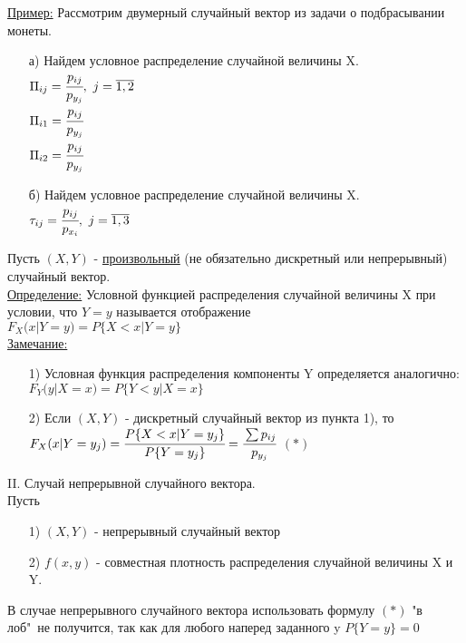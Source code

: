 \underline{Пример:} Рассмотрим двумерный случайный вектор из задачи о подбрасывании монеты. \\
\begin{enumerate}
\item[а)] Найдем условное распределение случайной величины X. \\
$\Pi_{ij} = \cfrac{p_{ij}}{p_{y_j}}, \ j = \overline{1,2}$ \\
$\Pi_{i1} = \cfrac{p_{ij}}{p_{y_j}}$ \\ %
$\Pi_{i2} = \cfrac{p_{ij}}{p_{y_j}}$ \\

\item[б)] Найдем условное распределение случайной величины X. \\
$\tau_{ij} = \cfrac{p_{ij}}{p_{x_i}}, \ j = \overline{1,3}$ \\
\end{enumerate}


Пусть $(X,Y)$ - \underline{\underline{произвольный}} (не обязательно дискретный или непрерывный) случайный вектор. \\
\underline{Определение:} Условной функцией распределения случайной величины X при условии, что $Y = y$ называется отображение \\
$F_X(x|Y = y) = P\{X < x|Y = y\}$ \\

\underline{Замечание:} 
\begin{enumerate}
\item[1)] Условная функция распределения компоненты Y определяется аналогично: \\
$F_Y(y|X = x) = P\{Y < y|X = x\}$

\item[2)] Если $(X,Y)$ - дискретный случайный вектор из пункта 1), то \\
$F_X(x|Y = y_j) = \cfrac{P\{X < x|Y = y_j\}}{P\{Y = y_j\}} = \cfrac{\sum p_{ij}}{p_{y_j}}$ $(*)$
\end{enumerate}


II. Случай непрерывной случайного вектора. \\
Пусть
\begin{enumerate}
\item[1)] $(X,Y)$ - непрерывный случайный вектор
\item[2)] $f(x,y)$ - совместная плотность распределения случайной величины X и Y.
\end{enumerate}
В случае непрерывного случайного вектора использовать формулу $(*)$ "в лоб"\ не получится, так как для любого наперед заданного y $P\{Y = y\} = 0$ \\



